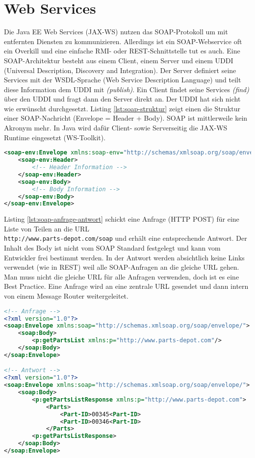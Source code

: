 \chapter{Web Services}

Die Java EE Web Services (JAX-WS) nutzen das SOAP-Protokoll um mit entfernten Diensten zu kommunizieren. Allerdings ist ein SOAP-Webservice oft ein Overkill und eine einfache RMI- oder REST-Schnittstelle tut es auch. Eine SOAP-Architektur besteht aus einem Client, einem Server und einem UDDI (Universal Description, Discovery and Integration). Der Server definiert seine Services mit der WSDL-Sprache (Web Service Description Language) und teilt diese Information dem UDDI mit \emph{(publish)}. Ein Client findet seine Services \emph{(find)} über den UDDI und fragt dann den Server direkt an. Der UDDI hat sich nicht wie erwünscht durchgesetzt. Listing \ref{lst:soap-struktur} zeigt einen die Struktur einer SOAP-Nachricht (Envelope = Header + Body). SOAP ist mittlerweile kein Akronym mehr. In Java wird dafür Client- sowie Serverseitig die JAX-WS Runtime eingesetzt (WS-Toolkit).

\begin{lstlisting}[language=XML, caption=SOAP Struktur, label=lst:soap-struktur]
<soap-env:Envelope xmlns:soap-env="http://schemas/xmlsoap.org/soap/envelope/">
	<soap-env:Header>
		<!-- Header Information -->
	</soap-env:Header>
	<soap-env:Body>
		<!-- Body Information -->
	</soap-env:Body>
</soap-env:Envelope>
\end{lstlisting}

Listing \ref{lst:soap-anfrage-antwort} schickt eine Anfrage (HTTP POST) für eine Liste von Teilen an die URL \\ \verb|http://www.parts-depot.com/soap| und erhält eine entsprechende Antwort. Der Inhalt des Body ist nicht vom SOAP Standard festgelegt und kann vom Entwickler frei bestimmt werden. In der Antwort werden absichtlich keine Links verwendet (wie in REST) weil alle SOAP-Anfragen an die gleiche URL gehen. Man muss nicht die gleiche URL für alle Anfragen verwenden, doch ist es eine Best Practice. Eine Anfrage wird an eine zentrale URL gesendet und dann intern von einem Message Router weitergeleitet.

\begin{lstlisting}[language=XML, caption=SOAP Anfrage/Antwort, label=lst:soap-anfrage-antwort]
<!-- Anfrage -->
<?xml version="1.0"?>
<soap:Envelope xmlns:soap="http://schemas.xmlsoap.org/soap/envelope/">
	<soap:Body>
		<p:getPartsList xmlns:p="http://www.parts-depot.com"/>
	</soap:Body>
</soap:Envelope>

<!-- Antwort -->
<?xml version="1.0"?>
<soap:Envelope xmlns:soap="http://schemas.xmlsoap.org/soap/envelope/">
	<soap:Body>
		<p:getPartsListResponse xmlns:p="http://www.parts-depot.com">
			<Parts>
				<Part-ID>00345<Part-ID>
				<Part-ID>00346<Part-ID>
			</Parts>
		<p:getPartsListResponse>
	</soap:Body>
</soap:Envelope>
\end{lstlisting}
